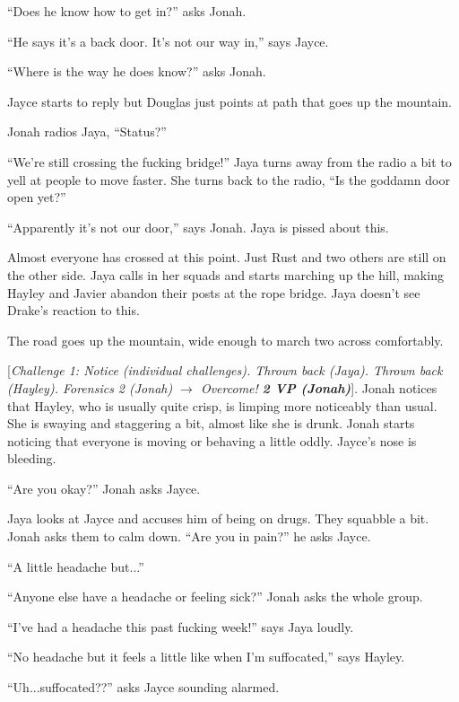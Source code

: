 ``Does he know how to get in?'' asks Jonah.

``He says it's a back door.  It's not our way in,'' says Jayce.

``Where is the way he does know?'' asks Jonah.

Jayce starts to reply but Douglas just points at path that goes up the mountain.

Jonah radios Jaya, ``Status?''

``We're still crossing the fucking bridge!''  Jaya turns away from the radio a bit to yell at people to move faster.  She turns back to the radio, ``Is the goddamn door open yet?''

``Apparently it's not our door,'' says Jonah.  Jaya is pissed about this.

Almost everyone has crossed at this point.  Just Rust and two others are still on the other side.  Jaya calls in her squads and starts marching up the hill, making Hayley and Javier abandon their posts at the rope bridge.  Jaya doesn't see Drake's reaction to this.





The road goes up the mountain, wide enough to march two across comfortably. 

{[}\textit{Challenge 1: Notice (individual challenges).  Thrown back (Jaya).  Thrown back (Hayley).  Forensics 2 (Jonah) $\rightarrow$ Overcome! }\textit{\textbf{2 VP (Jonah)}}{]}.  Jonah notices that Hayley, who is usually quite crisp, is limping more noticeably than usual.  She is swaying and staggering a bit, almost like she is drunk.  Jonah starts noticing that everyone is moving or behaving a little oddly.  Jayce's nose is bleeding.

``Are you okay?'' Jonah asks Jayce.

Jaya looks at Jayce and accuses him of being on drugs.  They squabble a bit.  Jonah asks them to calm down.  ``Are you in pain?'' he asks Jayce.

``A little headache but...''

``Anyone else have a headache or feeling sick?'' Jonah asks the whole group.

``I've had a headache this past fucking week!'' says Jaya loudly.

``No headache but it feels a little like when I'm suffocated,'' says Hayley.

``Uh...suffocated??'' asks Jayce sounding alarmed.

